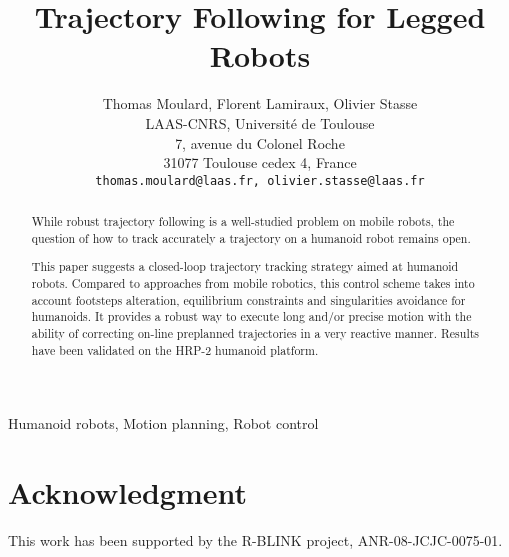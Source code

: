 \documentclass[conference,final]{IEEEtran}
\begin{document}
\title{Trajectory Following for Legged Robots}
%
\author{Thomas Moulard, Florent Lamiraux, Olivier Stasse\\
  LAAS-CNRS, Universit\'e de Toulouse\\
  7, avenue du Colonel Roche\\
  31077 Toulouse cedex 4, France\\
  \tt\small thomas.moulard@laas.fr, \tt\small olivier.stasse@laas.fr\\
}%
%
%
\maketitle
%
%
\begin{abstract}
  While robust trajectory following is a well-studied problem on
  mobile robots, the question of how to track accurately a trajectory
  on a humanoid robot remains open.

  This paper suggests a closed-loop trajectory tracking strategy
  aimed at humanoid robots. Compared to approaches from mobile
  robotics, this control scheme takes into account footsteps
  alteration, equilibrium constraints and singularities avoidance for
  humanoids. It provides a robust way to execute long and/or precise
  motion with the ability of correcting on-line preplanned
  trajectories in a very reactive manner. Results have been validated
  on the HRP-2 humanoid platform.
\end{abstract}
%
\begin{IEEEkeywords}
  Humanoid robots, Motion planning, Robot control
\end{IEEEkeywords}
%
\IEEEpeerreviewmaketitle
%
%





%
%
\section*{Acknowledgment}
%
This work has been supported by the R-BLINK project,
ANR-08-JCJC-0075-01.
%


%
\end{document}
